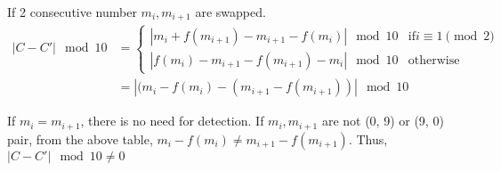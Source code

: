 If 2 consecutive number $m_i, m_{i+1}$ are swapped.
\begin{equation}
\begin{split}
|C - C'| \mod 10 & =
\begin{cases}
|m_i + f(m_{i + 1}) - m_{i+1} - f(m_i)| \mod 10 &\text{if} i \equiv 1 \pmod{2}
\\
|f(m_i) - m_{i+1} - f(m_{i+1}) - m_i| \mod 10 &\text{otherwise}
\end{cases}
\\
& = |(m_i - f(m_i) - (m_{i+1} - f(m_{i+1}))| \mod 10
\end{split}
\end{equation}

If $m_i = m_{i+1}$, there is no need for detection. If $m_i, m_{i+1}$ are not (0, 9) or (9, 0) pair, from the above table, $m_i - f(m_i) \neq m_{i+1} - f(m_{i +1})$. Thus, $|C - C'| \mod 10 \neq 0$